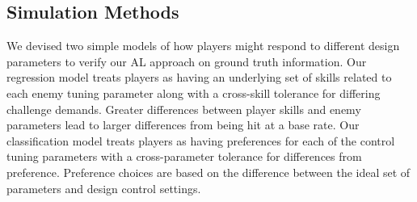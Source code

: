 \documentclass{sig-alternate}
\begin{document}
%

%

%

\subsection{Simulation Methods}
We devised two simple models of how players might respond to different design parameters to verify our AL approach on ground truth information.
Our regression model treats players as having an underlying set of skills related to each enemy tuning parameter along with a cross-skill tolerance for differing challenge demands.
Greater differences between player skills and enemy parameters lead to larger differences from being hit at a base rate.
Our classification model treats players as having preferences for each of the control tuning parameters with a cross-parameter tolerance for differences from preference.
Preference choices are based on the difference between the ideal set of parameters and design control settings.


\end{document}
